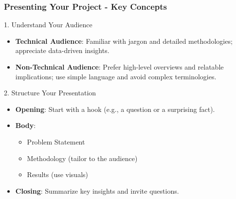 \documentclass[aspectratio=169]{beamer}
\begin{document}
\begin{frame}[fragile]
    \frametitle{Presenting Your Project - Key Concepts}
    \begin{block}{1. Understand Your Audience}
        \begin{itemize}
            \item \textbf{Technical Audience}: Familiar with jargon and detailed methodologies; appreciate data-driven insights.
            \item \textbf{Non-Technical Audience}: Prefer high-level overviews and relatable implications; use simple language and avoid complex terminologies.
        \end{itemize}
    \end{block}

    \begin{block}{2. Structure Your Presentation}
        \begin{itemize}
            \item \textbf{Opening}: Start with a hook (e.g., a question or a surprising fact).
            \item \textbf{Body}:
                \begin{itemize}
                    \item Problem Statement
                    \item Methodology (tailor to the audience)
                    \item Results (use visuals)
                \end{itemize}
            \item \textbf{Closing}: Summarize key insights and invite questions.
        \end{itemize}
    \end{block}
\end{frame}
\end{document}
